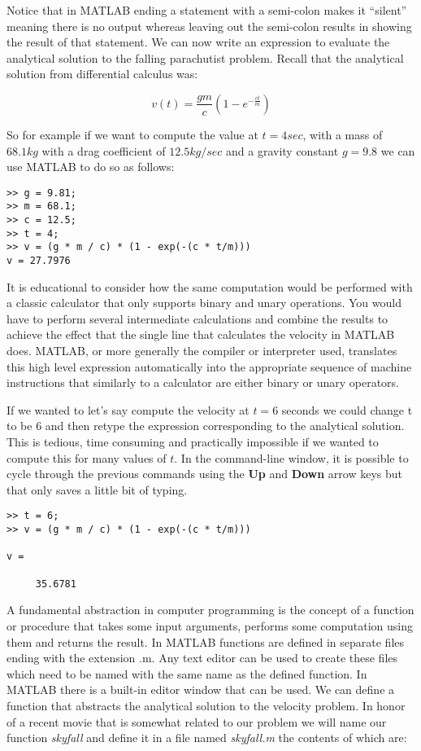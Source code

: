 \documentclass [titlepage,12pt,letter] {article}
\begin{document}
Notice that in MATLAB ending a statement with a semi-colon makes it
``silent'' meaning there is no output whereas leaving out the
semi-colon results in showing the result of that statement. We can now
write an expression to evaluate the analytical solution to the falling
parachutist problem. Recall that the analytical solution from
differential calculus was: 

\begin{equation} 
v(t) = \frac{gm}{c} (1 - e^{-\frac{ct}{m}})
\end{equation} 


So for example if we want to compute the value at $t=4 sec$, with
a mass of $68.1 kg$ with a drag coefficient of $12.5 kg/sec$ and a
gravity constant $g = 9.8$ we can use MATLAB to do so as follows: 

\begin{verbatim} 
>> g = 9.81;
>> m = 68.1;
>> c = 12.5;
>> t = 4; 
>> v = (g * m / c) * (1 - exp(-(c * t/m)))
v = 27.7976 
\end{verbatim} 

\noindent 

It is educational to consider how the same computation would be
performed with a classic calculator that only supports binary and
unary operations. You would have to perform several intermediate
calculations and combine the results to achieve the effect that the
single line that calculates the velocity in MATLAB does. MATLAB, or
more generally the compiler or interpreter used, translates this high
level expression automatically into the appropriate sequence of
machine instructions that similarly to a calculator are either binary
or unary operators.

If we wanted to let's say compute the velocity at $t = 6$ seconds we
could change t to be $6$ and then retype the expression corresponding
to the analytical solution. This is tedious, time consuming and
practically impossible if we wanted to compute this for many values of
$t$. In the command-line window, it is possible to cycle through the
previous commands using the {\bf Up} and {\bf Down} arrow keys but
that only saves a little bit of typing. 

\begin{verbatim} 
>> t = 6; 
>> v = (g * m / c) * (1 - exp(-(c * t/m)))

v = 

     35.6781 
\end{verbatim} 


A fundamental abstraction in
computer programming is the concept of a function or procedure that
takes some input arguments, performs some computation using them and
returns the result. In MATLAB functions are defined in
separate files ending with the extension .m. Any text editor can be
used to create these files which need to be named with the same name
as the defined function. In MATLAB there is a built-in editor window
that can be used. We can define a function that abstracts the
analytical solution to the velocity problem. In honor of a 
recent movie that is somewhat related to our problem we will name 
our function {\it skyfall} and define it in a file named {\it skyfall.m} 
the contents of which are: 
\end{document}
